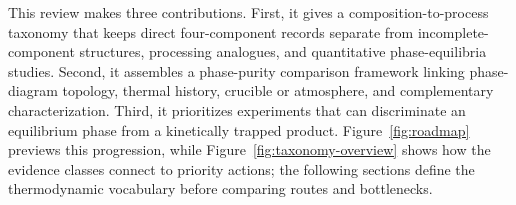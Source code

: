 This review makes three contributions. First, it gives a composition-to-process taxonomy that keeps direct four-component records separate from incomplete-component structures, processing analogues, and quantitative phase-equilibria studies. Second, it assembles a phase-purity comparison framework linking phase-diagram topology, thermal history, crucible or atmosphere, and complementary characterization. Third, it prioritizes experiments that can discriminate an equilibrium phase from a kinetically trapped product. Figure~\ref{fig:roadmap} previews this progression, while Figure~\ref{fig:taxonomy-overview} shows how the evidence classes connect to priority actions; the following sections define the thermodynamic vocabulary before comparing routes and bottlenecks.

